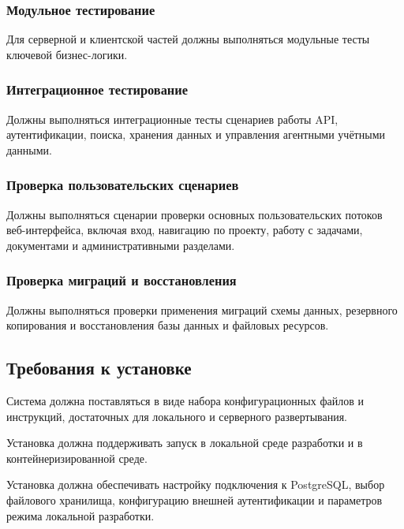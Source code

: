 \headingtextsep

\subsubsection{Модульное тестирование}

Для серверной и клиентской частей должны выполняться модульные тесты ключевой бизнес-логики.

\subsubsection{Интеграционное тестирование}

Должны выполняться интеграционные тесты сценариев работы API, аутентификации, поиска, хранения данных и управления агентными учётными данными.

\subsubsection{Проверка пользовательских сценариев}

Должны выполняться сценарии проверки основных пользовательских потоков веб-интерфейса, включая вход, навигацию по проекту, работу с задачами, документами и административными разделами.

\subsubsection{Проверка миграций и восстановления}

Должны выполняться проверки применения миграций схемы данных, резервного копирования и восстановления базы данных и файловых ресурсов.

\textheadingsep
\subsection{Требования к установке}

\headingtextsep

Система должна поставляться в виде набора конфигурационных файлов и инструкций, достаточных для локального и серверного развертывания.

Установка должна поддерживать запуск в локальной среде разработки и в контейнеризированной среде.

Установка должна обеспечивать настройку подключения к PostgreSQL, выбор файлового хранилища, конфигурацию внешней аутентификации и параметров режима локальной разработки.


